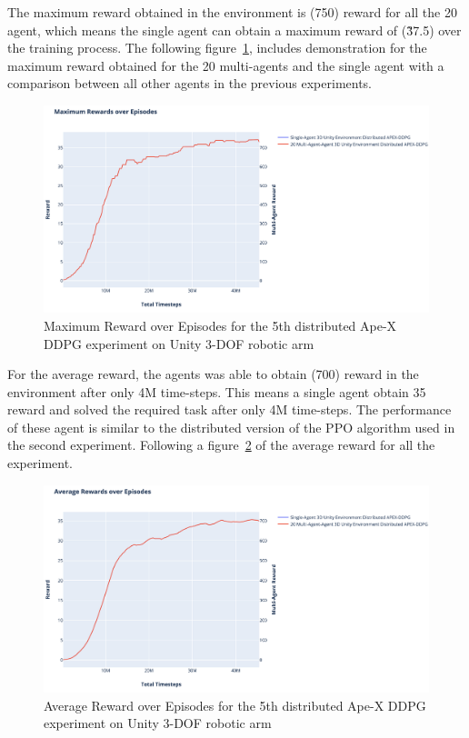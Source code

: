 The maximum reward obtained in the environment is (750) reward for all the 20 agent, which means the single agent can obtain a maximum reward of (\~37.5) over the training process. The following figure~\ref{fig:4th_exp_max_eps_reward}, includes demonstration for the maximum reward obtained for the 20 multi-agents and the single agent with a comparison between all other agents in the previous experiments.
\begin{figure}[!htb]
		\centering
		\includegraphics[width=\linewidth]{figures/exps/4th_exp/max_eps_reward.png}
		\caption[Maximum Reward over Episodes for the 5th distributed Ape-X DDPG experiment on Unity 3-DOF robotic arm]{Maximum Reward over Episodes for the 5th distributed Ape-X DDPG experiment on Unity 3-DOF robotic arm\footnotemark}
		\label{fig:4th_exp_max_eps_reward}
\end{figure}

For the average reward, the agents was able to obtain (700) reward in the environment after only 4M time-steps. This means a single agent obtain 35 reward and solved the required task after only 4M time-steps. The performance of these agent is similar to the distributed version of the PPO algorithm used in the second experiment. Following a figure~\ref{fig:4th_exp_avg_eps_reward} of the average reward for all the experiment.
\begin{figure}[!htb]
		\centering
		\includegraphics[width=\linewidth]{figures/exps/4th_exp/avg_eps_reward.png}
		\caption[Average Reward over Episodes for the 5th distributed Ape-X DDPG experiment on Unity 3-DOF robotic arm]{Average Reward over Episodes for the 5th distributed Ape-X DDPG experiment on Unity 3-DOF robotic arm\footnotemark}
		\label{fig:4th_exp_avg_eps_reward}
\end{figure}

